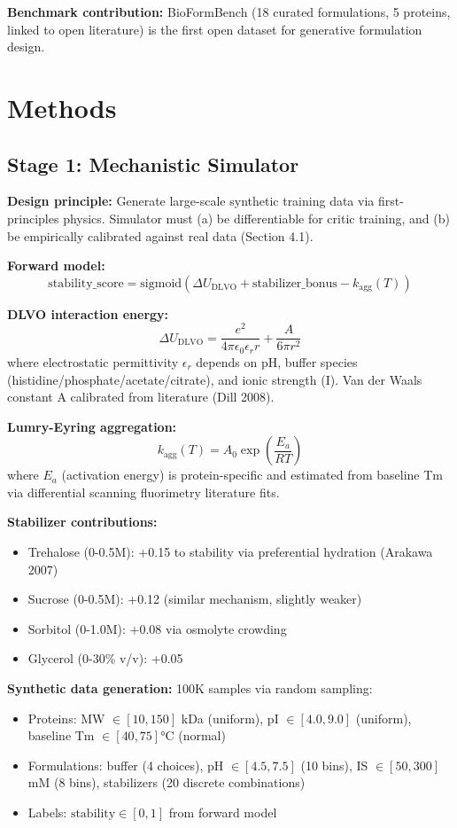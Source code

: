 \documentclass[11pt]{article}
\begin{document}
\textbf{Benchmark contribution:} BioFormBench (18 curated formulations, 5 proteins, linked to open literature) is the first open dataset for generative formulation design.

\section{Methods}

\subsection{Stage 1: Mechanistic Simulator}

\textbf{Design principle:} Generate large-scale synthetic training data via first-principles physics. Simulator must (a) be differentiable for critic training, and (b) be empirically calibrated against real data (Section 4.1).

\textbf{Forward model:}
\[
\text{stability\_score} = \text{sigmoid}(\Delta U_{\text{DLVO}} + \text{stabilizer\_bonus} - k_{\text{agg}}(T))
\]

\textbf{DLVO interaction energy:}
\[
\Delta U_{\text{DLVO}} = \frac{e^2}{4\pi\epsilon_0 \epsilon_r r} + \frac{A}{6\pi r^2}
\]
where electrostatic permittivity $\epsilon_r$ depends on pH, buffer species (histidine/phosphate/acetate/citrate), and ionic strength (I). Van der Waals constant A calibrated from literature (Dill 2008).

\textbf{Lumry-Eyring aggregation:}
\[
k_{\text{agg}}(T) = A_0 \exp\left(\frac{E_a}{RT}\right)
\]
where $E_a$ (activation energy) is protein-specific and estimated from baseline Tm via differential scanning fluorimetry literature fits.

\textbf{Stabilizer contributions:}
\begin{itemize}
    \item Trehalose (0-0.5M): +0.15 to stability via preferential hydration (Arakawa 2007)
    \item Sucrose (0-0.5M): +0.12 (similar mechanism, slightly weaker)
    \item Sorbitol (0-1.0M): +0.08 via osmolyte crowding
    \item Glycerol (0-30\% v/v): +0.05
\end{itemize}

\textbf{Synthetic data generation:} 100K samples via random sampling:
\begin{itemize}
    \item Proteins: MW $\in [10, 150]$ kDa (uniform), pI $\in [4.0, 9.0]$ (uniform), baseline Tm $\in [40, 75]$°C (normal)
    \item Formulations: buffer (4 choices), pH $\in [4.5, 7.5]$ (10 bins), IS $\in [50, 300]$ mM (8 bins), stabilizers (20 discrete combinations)
    \item Labels: $\text{stability} \in [0, 1]$ from forward model
\end{itemize}
\end{document}

